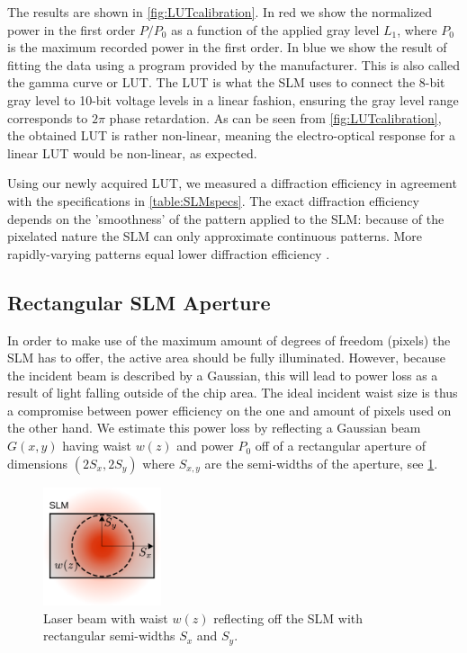 The results are shown in \cref{fig:LUTcalibration}. 
In red we show the normalized power in the first order $P/P_0$ as a function of the applied gray level $L_1$, where $P_0$ is the maximum recorded power in the first order.
In blue we show the result of fitting the data using a program provided by the manufacturer.
This is also called the gamma curve or \ac{LUT}.
The LUT is what the SLM uses to connect the 8-bit gray level to 10-bit voltage levels in a linear fashion, ensuring the gray level range corresponds to $2\pi$ phase retardation.
As can be seen from \cref{fig:LUTcalibration}, the obtained LUT is rather non-linear, meaning the electro-optical response for a linear LUT would be non-linear, as expected. 

Using our newly acquired LUT, we measured a diffraction efficiency in agreement with the specifications in \cref{table:SLMspecs}. 
The exact diffraction efficiency depends on the 'smoothness' of the pattern applied to the SLM: because of the pixelated nature the SLM can only approximate continuous patterns. 
More rapidly-varying patterns equal lower diffraction efficiency \cite{Labuhn2016}.

\subsection{Rectangular SLM Aperture}\label{subsec:ApertureSize}

In order to make use of the maximum amount of degrees of freedom (pixels) the SLM has to offer, the active area should be fully illuminated.
However, because the incident beam is described by a Gaussian, this will lead to power loss as a result of light falling outside of the chip area.
The ideal incident waist size is thus a compromise between power efficiency on the one and amount of pixels used on the other hand.
We estimate this power loss by reflecting a Gaussian beam $G(x,y)$ having waist $w(z)$ and power $P_0$ off of a rectangular aperture of dimensions $(2S_x, 2S_y)$ where $S_{x,y}$ are the semi-widths of the aperture, see \cref{fig:Rectangular}.
\begin{figure}[]
    \centering
    \includegraphics[width=0.31\textwidth]{figures/RectangularAperture.pdf}
    \caption{Laser beam with waist $w(z)$ reflecting off the SLM with rectangular semi-widths $S_x$ and $S_y$.}
    \label{fig:Rectangular}
\end{figure}

